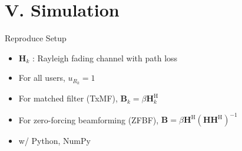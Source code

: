 \documentclass[aspectratio=169, 10pt]{beamer}
\begin{document}
\section{V. Simulation}
\OnlyTitle
\begin{frame}{\insertsectionhead}
    \begin{block}{Reproduce Setup}

        \begin{itemize}
            \setlength{\itemsep}{1em}
            \item $\mathbf{H}_k$ : Rayleigh fading channel with path loss
            \item For all users, $u_{R_k} = 1$
            \item For matched filter (TxMF), $\mathbf{B}_k = \beta \mathbf{H}_k^\mathrm{H}$
            \item For zero-forcing beamforming (ZFBF), $\mathbf{B} = \beta \mathbf{H}^\mathrm{H}(\mathbf{H}\mathbf{H}^\mathrm{H})^{-1}$
            \item w/ Python, NumPy
        \end{itemize}
    \end{block}

\end{frame}
\end{document}
